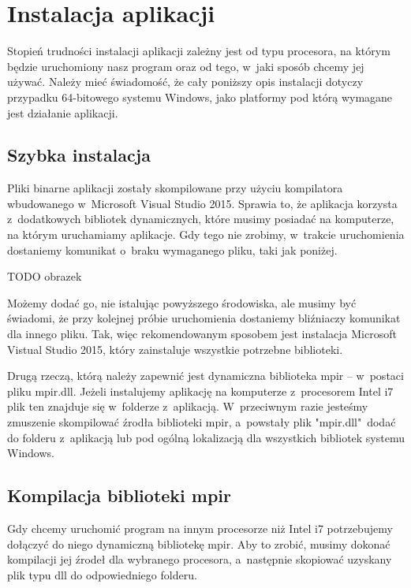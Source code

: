 \section{Instalacja aplikacji}

Stopień trudności instalacji aplikacji zależny jest od typu procesora, na którym będzie uruchomiony nasz program oraz od tego, w~jaki sposób chcemy jej używać. Należy mieć świadomość, że cały poniższy opis instalacji dotyczy przypadku 64-bitowego systemu Windows, jako platformy pod którą wymagane jest działanie aplikacji.

\subsection{Szybka instalacja}

Pliki binarne aplikacji zostały skompilowane przy użyciu kompilatora wbudowanego w~Microsoft Visual Studio 2015. Sprawia to, że aplikacja korzysta z~dodatkowych bibliotek dynamicznych, które musimy posiadać na komputerze, na którym uruchamiamy aplikacje. Gdy tego nie zrobimy, w~trakcie uruchomienia dostaniemy komunikat o~braku wymaganego pliku, taki jak poniżej.

TODO obrazek

Możemy dodać go, nie istalując powyższego środowiska, ale musimy być świadomi, że przy kolejnej próbie uruchomienia dostaniemy bliźniaczy komunikat dla innego pliku. Tak, więc rekomendowanym sposobem jest instalacja Microsoft Vistual Studio 2015, który zainstaluje wszystkie potrzebne biblioteki.

Drugą rzeczą, którą należy zapewnić jest dynamiczna biblioteka mpir -- w~postaci pliku mpir.dll. Jeżeli instalujemy aplikację na komputerze z~procesorem Intel i7 plik ten znajduje się w~folderze z~aplikacją. W~przeciwnym razie jesteśmy zmuszenie skompilować źrodła biblioteki mpir, a~powstały plik "mpir.dll"\ dodać do folderu z~aplikacją lub pod ogólną lokalizacją dla wszystkich bibliotek systemu Windows.

\subsection{Kompilacja biblioteki mpir}

Gdy chcemy uruchomić program na innym procesorze niż Intel i7 potrzebujemy dołączyć do niego dynamiczną bibliotekę mpir. Aby to zrobić, musimy dokonać kompilacji jej źrodeł dla wybranego procesora, a~następnie skopiować uzyskany plik typu dll do odpowiedniego folderu.

